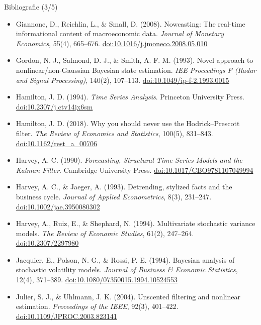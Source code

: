 \begin{frame}{Bibliografie (3/5)}
\itemsize{\tiny}
\begin{itemize}
    \item Giannone, D., Reichlin, L., \& Small, D. (2008). Nowcasting: The real-time informational content of macroeconomic data. \textit{Journal of Monetary Economics}, 55(4), 665--676. \href{https://doi.org/10.1016/j.jmoneco.2008.05.010}{doi:10.1016/j.jmoneco.2008.05.010}
    \item Gordon, N. J., Salmond, D. J., \& Smith, A. F. M. (1993). Novel approach to nonlinear/non-Gaussian Bayesian state estimation. \textit{IEE Proceedings F (Radar and Signal Processing)}, 140(2), 107--113. \href{https://doi.org/10.1049/ip-f-2.1993.0015}{doi:10.1049/ip-f-2.1993.0015}
    \item Hamilton, J. D. (1994). \textit{Time Series Analysis}. Princeton University Press. \href{https://doi.org/10.2307/j.ctv14jx6sm}{doi:10.2307/j.ctv14jx6sm}
    \item Hamilton, J. D. (2018). Why you should never use the Hodrick--Prescott filter. \textit{The Review of Economics and Statistics}, 100(5), 831--843. \href{https://doi.org/10.1162/rest_a_00706}{doi:10.1162/rest\_a\_00706}
    \item Harvey, A. C. (1990). \textit{Forecasting, Structural Time Series Models and the Kalman Filter}. Cambridge University Press. \href{https://doi.org/10.1017/CBO9781107049994}{doi:10.1017/CBO9781107049994}
    \item Harvey, A. C., \& Jaeger, A. (1993). Detrending, stylized facts and the business cycle. \textit{Journal of Applied Econometrics}, 8(3), 231--247. \href{https://doi.org/10.1002/jae.3950080302}{doi:10.1002/jae.3950080302}
    \item Harvey, A., Ruiz, E., \& Shephard, N. (1994). Multivariate stochastic variance models. \textit{The Review of Economic Studies}, 61(2), 247--264. \href{https://doi.org/10.2307/2297980}{doi:10.2307/2297980}
    \item Jacquier, E., Polson, N. G., \& Rossi, P. E. (1994). Bayesian analysis of stochastic volatility models. \textit{Journal of Business \& Economic Statistics}, 12(4), 371--389. \href{https://doi.org/10.1080/07350015.1994.10524553}{doi:10.1080/07350015.1994.10524553}
    \item Julier, S. J., \& Uhlmann, J. K. (2004). Unscented filtering and nonlinear estimation. \textit{Proceedings of the IEEE}, 92(3), 401--422. \href{https://doi.org/10.1109/JPROC.2003.823141}{doi:10.1109/JPROC.2003.823141}

\end{itemize}
\end{frame}
